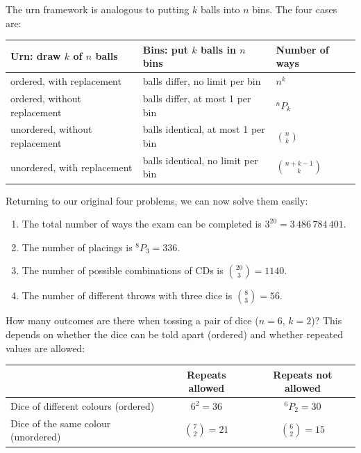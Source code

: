 The urn framework is analogous to putting $k$ balls into $n$ bins. The four cases are:
\begin{center}
\begin{tabular}{@{}lll@{}}
\toprule
Urn: draw $k$ of $n$ balls & Bins: put $k$ balls in $n$ bins & Number of ways \\
\midrule
ordered, with replacement & balls differ, no limit per bin & $n^k$ \\
ordered, without replacement & balls differ, at most 1 per bin & ${}^nP_k$ \\
unordered, without replacement & balls identical, at most 1 per bin & $\binom{n}{k}$ \\
unordered, with replacement & balls identical, no limit per bin & $\binom{n+k-1}{k}$ \\
\bottomrule
\end{tabular}
\end{center}

Returning to our original four problems, we can now solve them easily:
\begin{enumerate}
  \item The total number of ways the exam can be completed is $3^{20} = 3\,486\,784\,401$.
  \item The number of placings is ${}^8P_3 = 336$.
  \item The number of possible combinations of CDs is $\binom{20}{3} = 1140$.
  \item The number of different throws with three dice is $\binom{8}{3} = 56$.
\end{enumerate}

\begin{example}\label{ex:counting-pair-of-dice}
How many outcomes are there when tossing a pair of dice ($n = 6$, $k = 2$)? This depends on whether the dice can be told apart (ordered) and whether repeated values are allowed:
\begin{center}
\begin{tabular}{@{}lcc@{}}
\toprule
 & Repeats allowed & Repeats not allowed \\
\midrule
Dice of different colours (ordered) & $6^2 = 36$ & ${}^6P_2 = 30$ \\
Dice of the same colour (unordered) & $\binom{7}{2} = 21$ & $\binom{6}{2} = 15$ \\
\bottomrule
\end{tabular}
\end{center}
\end{example}

